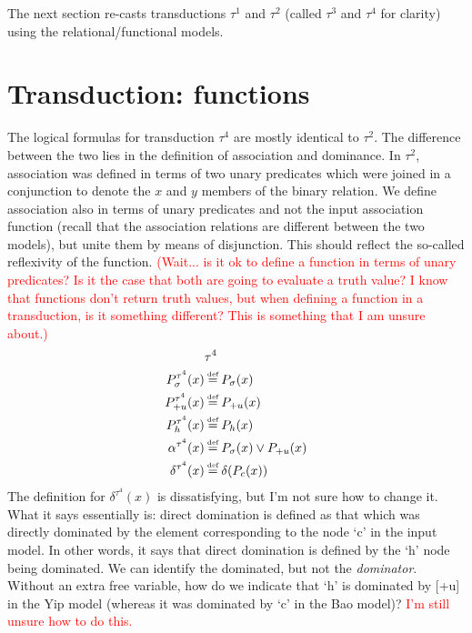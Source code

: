 \documentclass{article}
\newcommand\myeq{\mathrel{\stackrel{\makebox[0pt]{\mbox{\normalfont\tiny def}}}{=}}}
\begin{document}
The next section re-casts transductions $\tau^1$ and $\tau^2$ (called $\tau^3$ and $\tau^4$ for clarity) using the relational/functional models. 
\section{Transduction: functions}
The logical formulas for transduction $\tau^4$ are mostly identical to $\tau^2$. The difference between the two lies in the definition of association and dominance. In $\tau^2$, association was defined in terms of two unary predicates which were joined in a conjunction to denote the $x$ and $y$ members of the binary relation. We define association also in terms of unary predicates and not the input association function (recall that the association relations are different between the two models), but unite them by means of disjunction. This should reflect the so-called reflexivity of the function. \textcolor{red}{(Wait... is it ok to define a function in terms of unary predicates? Is it the case that both are going to evaluate a truth value? I know that functions don't return truth values, but when defining a function in a transduction, is it something different? This is something that I am unsure about.)}
\begin{equation}
\begin{split}
&\tau^4 \\
P^{\tau^4}_{\sigma}(x) &\myeq P_{\sigma}(x) \\
P^{\tau^4}_{+u}(x) &\myeq P_{+u}(x) \\
P^{\tau^4}_{h}(x) &\myeq P_{h}(x) \\
\alpha^{\tau^4}(x) &\myeq P_{\sigma}(x) \lor P_{+u}(x) \\
\delta^{\tau^4}(x) &\myeq \delta(P_{c}(x))\\ 
\end{split}
\end{equation}
The definition for $\delta^{\tau^4}(x)$ is dissatisfying, but I'm not sure how to change it. What it says essentially is: direct domination is defined as that which was directly dominated by the element corresponding to the node `c' in the input model. In other words, it says that direct domination is defined by the `h' node being dominated. We can identify the dominated, but not the \emph{dominator}. Without an extra free variable, how do we indicate that `h' is dominated by [+u] in the Yip model (whereas it was dominated by `c' in the Bao model)? \textcolor{red}{I'm still unsure how to do this.}\par
\end{document}
